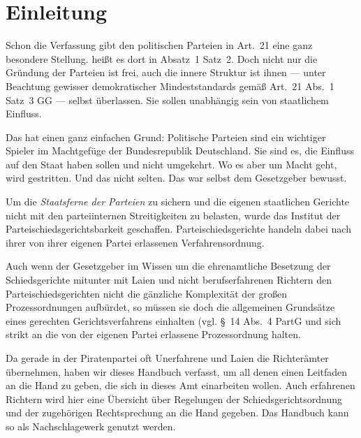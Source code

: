
\chapter{Einleitung}
Schon die Verfassung gibt den politischen Parteien in Art.~21 eine ganz besondere Stellung.
 heißt es dort in Absatz~1 Satz~2.
Doch nicht nur die Gründung der Parteien ist frei, auch die innere Struktur ist ihnen --- unter Beachtung gewisser demokratischer Mindeststandards gemäß Art.~21 Abs.~1 Satz~3 GG --- selbst überlassen.
Sie sollen unabhängig sein von staatlichem Einfluss.

Das hat einen ganz einfachen Grund: Politische Parteien sind ein wichtiger Spieler im Machtgefüge der Bundesrepublik Deutschland.
Sie sind es, die Einfluss auf den Staat haben sollen und nicht umgekehrt.
Wo es aber um Macht geht, wird gestritten.
Und das nicht selten.
Das war selbst dem Gesetzgeber bewusst.

Um die \emph{Staatsferne der Parteien} zu sichern und die eigenen staatlichen Gerichte nicht mit den parteiinternen Streitigkeiten zu belasten, wurde das Institut der Parteischiedsgerichtsbarkeit geschaffen.
Parteischiedsgerichte handeln dabei nach ihrer von ihrer eigenen Partei erlassenen Verfahrensordnung.

Auch wenn der Gesetzgeber im Wissen um die ehrenamtliche Besetzung der Schiedsgerichte mitunter mit Laien und nicht berufserfahrenen Richtern den Parteischiedsgerichten nicht die gänzliche Komplexität der großen Prozessordnungen aufbürdet, so müssen sie doch die allgemeinen Grundsätze eines gerechten Gerichtsverfahrens einhalten (vgl. \S~14 Abs.~4 PartG und sich strikt an die von der eigenen Partei erlassene Prozessordnung halten.

Da gerade in der Piratenpartei oft Unerfahrene und Laien die Richterämter übernehmen, haben wir dieses Handbuch verfasst, um all denen einen Leitfaden an die Hand zu geben, die sich in dieses Amt einarbeiten wollen.
Auch erfahrenen Richtern wird hier eine Übersicht über Regelungen der Schiedsgerichtsordnung und der zugehörigen Rechtsprechung an die Hand gegeben. Das Handbuch kann so als Nachschlagewerk genutzt werden.

